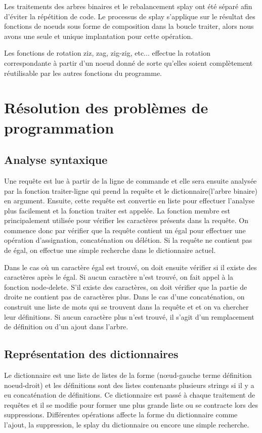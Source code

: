 \documentclass{article}
\begin{document}
  Les traitements des arbres binaires et le rebalancement splay ont été séparé
  afin d'éviter la répétition de code. Le processus de splay s'applique sur le
  résultat des fonctions de noeuds sous forme de composition dans la boucle
  \textsf{traiter}, alors nous avons une seule et unique implantation pour cette
  opération.

  Les fonctions de rotation \textsf{ziz}, \textsf{zag}, \textsf{zig-zig}, etc...
  effectue la rotation correspondante à partir d'un noeud donné de sorte
  qu'elles soient complètement réutilisable par les autres fonctions du
  programme.

  \section{Résolution des problèmes de programmation}

  \subsection{Analyse syntaxique}
  Une requête est lue à partir de la ligne de commande et elle sera ensuite
  analysée par la fonction traiter-ligne qui prend la requête et le
  dictionnaire(l'arbre binaire) en argument. Ensuite, cette requête est
  convertie en liste pour effectuer l'analyse plus facilement et la fonction
  traiter est appelée. La fonction membre est principalement utilisée pour
  vérifier les caractères présents dans la requête. On commence donc par
  vérifier que la requête contient un égal pour effectuer une opération
  d'assignation, concaténation ou délétion. Si la requête ne contient pas de
  égal, on effectue une simple recherche dans le dictionnaire actuel.

  Dans le cas où un caractère égal est trouvé, on doit ensuite vérifier si il
  existe des caractères après le égal. Si aucun caractère n'est trouvé, on fait
  appel à la fonction node-delete. S'il existe des caractères, on doit vérifier
  que la partie de droite ne contient pas de caractères plus. Dans le cas d'une
  concaténation, on construit une liste de mots qui se trouvent dans la requête
  et et on va chercher leur définitions. Si aucun caractère plus n'est trouvé,
  il s'agit d'un remplacement de définition ou d'un ajout dans l'arbre.

  \subsection{Représentation des dictionnaires}
  Le dictionnaire est une liste de listes de la forme (nœud-gauche terme
  définition noeud-droit) et les définitions sont des listes contenants
  plusieurs strings si il y a eu concaténation de définitions.  Ce
  dictionnaire est passé à chaque traitement de requêtes et il se modifie pour
  former une plus grande liste ou se contracte lors des suppressions.
  Différentes opérations affecte la forme du dictionnaire comme l'ajout, la
  suppression, le splay du dictionnaire ou encore une simple recherche.
\end{document}
